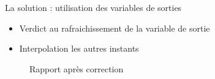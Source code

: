 \documentclass{beamer}
\begin{document}
	\begin{frame}{\normalsize La solution : utilisation des variables de sorties}		
		\begin{itemize}
			\item Verdict au rafraichissement de la variable de sortie
			\item Interpolation les autres instants
		\end{itemize}
		\begin{figure}
		\centering
		\caption{Rapport après correction}
		\label{fig:goodReport}
		\end{figure}
	\end{frame}
	
\end{document}
